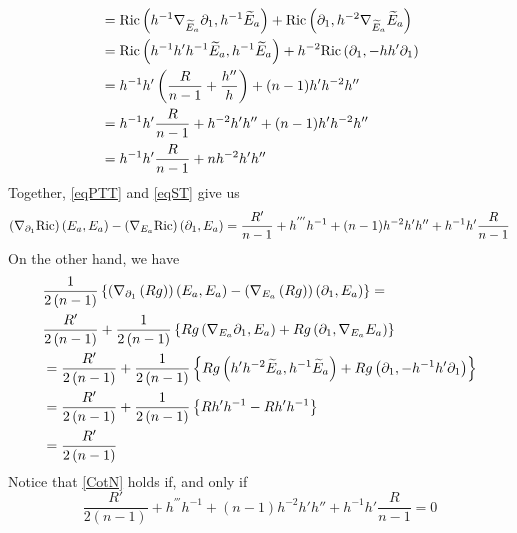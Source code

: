 \begin{demm}
\begin{equation}
\begin{aligned}
                    &= \mathrm{Ric}\left(h^{-1} \nabla_{\widetilde{E}_a}\partial_1, h^{-1} \widetilde{E}_a\right) + \mathrm{Ric}\left(\partial_1, h^{-2} \nabla_{\widetilde{E}_a}\widetilde{E}_a\right) \\
                    &=\mathrm{Ric}\left(h^{-1} h' h^{-1} \widetilde{E}_a, h^{-1} \widetilde{E}_a\right) + h^{-2}\mathrm{Ric}\left(\partial_1, -h h' \partial_1\right) \\
                    &= h^{-1} h' \left(\frac{R}{n-1} + \frac{h''}{h}\right) + (n-1) h' h^{-2} h'' \\
                    &= h^{-1} h' \frac{R}{n-1} + h^{-2} h' h''+ (n-1) h' h^{-2} h'' \\
                    &=  h^{-1} h' \frac{R}{n-1} + n h^{-2}h'  h'' 
                \end{aligned}
            \end{equation}
            Together, \cref{eqPTT} and \cref{eqST} give us
            \begin{equation}
                \left(\nabla_{\partial_1} \mathrm{Ric} \right)(E_a, E_a) -  \left(\nabla_{E_a} \mathrm{Ric} \right)(\partial_1, E_a) =  \frac{R'}{n-1} + h^{'''}h^{-1} + (n-1)h^{-2}h'  h'' + h^{-1} h' \frac{R}{n-1} 
            \end{equation}
            On the other hand, we have
            \begin{equation}
                \begin{aligned}
                    &\frac{1}{2\left(n-1\right)} \left\{ \left( \nabla_{\partial_1} \left(Rg\right)\right)\left(E_a, E_a\right)  -  \left( \nabla_{E_a} \left(Rg\right)\right)\left(\partial_1, E_a\right)   \right\} = \\
                    &\frac{R'}{2\left(n-1\right)} + \frac{1}{2\left(n-1\right)} \left\{Rg\left(\nabla_{E_a} \partial_1, E_a \right) + Rg\left(\partial_1, \nabla_{E_a}E_a\right)\right\} \\
                    &= \frac{R'}{2\left(n-1\right)} + \frac{1}{2\left(n-1\right)} \left\{ R g \left(h' h^{-2} \widetilde{E}_a, h^{-1} \widetilde{E}_a\right) + R g \left(\partial_1, -h^{-1} h' \partial_1\right) \right\} \\
                    &= \frac{R'}{2\left(n-1\right)} + \frac{1}{2\left(n-1\right)} \left\{ R h' h^{-1} - R h' h^{-1}  \right\}  \\
                    &= \frac{R'}{2\left(n-1\right)} 
                \end{aligned}
            \end{equation}
            Notice that \cref{CotN} holds if, and only if
            \begin{equation}\label{318}
             \frac{R'}{2(n-1)} + h^{'''}h^{-1} + (n-1)h^{-2}h'  h'' + h^{-1} h' \frac{R}{n-1} = 0

\end{equation}
\end{demm}
